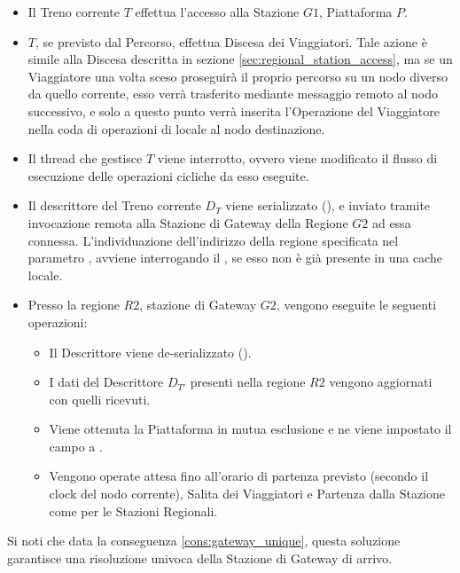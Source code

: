	\begin{itemize}
		\item Il Treno corrente $T$ effettua l'accesso alla Stazione $G1$, Piattaforma $P$.
		
		\item $T$, se previsto dal Percorso, effettua Discesa dei Viaggiatori. Tale azione è simile alla Discesa descritta in sezione \ref{sec:regional_station_access}, ma se un Viaggiatore una volta sceso proseguirà il proprio percorso su un nodo diverso da quello corrente, esso verrà trasferito mediante messaggio remoto al nodo successivo, e solo a questo punto verrà inserita l'Operazione  del Viaggiatore nella coda di operazioni di  locale al nodo destinazione.
		
		\item Il thread che gestisce $T$ viene interrotto, ovvero viene modificato il flusso di esecuzione delle operazioni cicliche da esso eseguite.
		\item Il descrittore del Treno corrente $D_T$ viene serializzato (), e inviato tramite invocazione remota alla Stazione di Gateway della Regione $G2$ ad essa connessa. L'individuazione dell'indirizzo della regione specificata nel parametro , avviene interrogando il , se esso non è già presente in una cache locale.
		\item Presso la regione $R2$, stazione di Gateway $G2$, vengono eseguite le seguenti operazioni:
			\begin{itemize}
				\item Il Descrittore viene de-serializzato ().
				\item I dati del Descrittore $D_{T'}$ presenti nella regione $R2$ vengono aggiornati con quelli ricevuti.
				\item Viene ottenuta la Piattaforma in mutua esclusione e ne viene impostato il campo  a .
				\item Vengono operate attesa fino all'orario di partenza previsto (secondo il clock del nodo corrente), Salita dei Viaggiatori e Partenza dalla Stazione come per le Stazioni Regionali.
			\end{itemize}
	\end{itemize}

	Si noti che data la conseguenza \ref{cons:gateway_unique}, questa soluzione garantisce una risoluzione univoca della Stazione di Gateway di arrivo.
	
